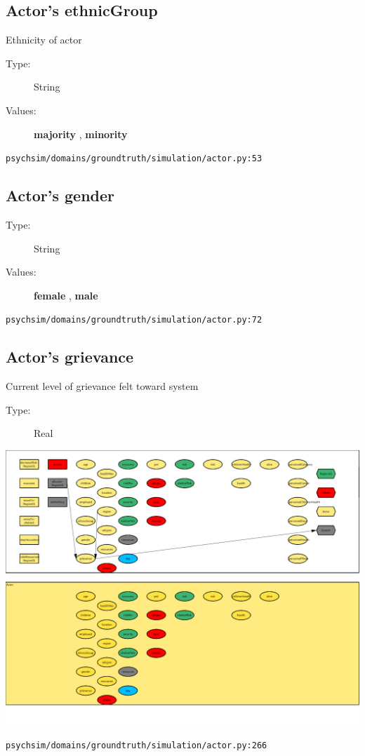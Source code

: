 \documentclass{article}%
\begin{document}
%
\subsection{Actor's ethnicGroup}%
\label{subsec:Actor's ethnicGroup}%
Ethnicity of actor%
\begin{description}%
\item[Type:]%
String%
\item[Values:]%
\textbf{majority}%
, %
\textbf{minority}%
\end{description}%
\begin{flushleft}%
\verb|psychsim/domains/groundtruth/simulation/actor.py:53|%
\end{flushleft}

%
\subsection{Actor's gender}%
\label{subsec:Actor's gender}%
\begin{description}%
\item[Type:]%
String%
\item[Values:]%
\textbf{female}%
, %
\textbf{male}%
\end{description}%
\begin{flushleft}%
\verb|psychsim/domains/groundtruth/simulation/actor.py:72|%
\end{flushleft}

%
\subsection{Actor's grievance}%
\label{subsec:Actor's grievance}%
Current level of grievance felt toward system%
\begin{description}%
\item[Type:]%
Real%
\end{description}%
\includegraphics[width=\textwidth]{images/grievanceOfActor.png}%
\begin{flushleft}%
\verb|psychsim/domains/groundtruth/simulation/actor.py:266|%
\end{flushleft}%
\end{document}
